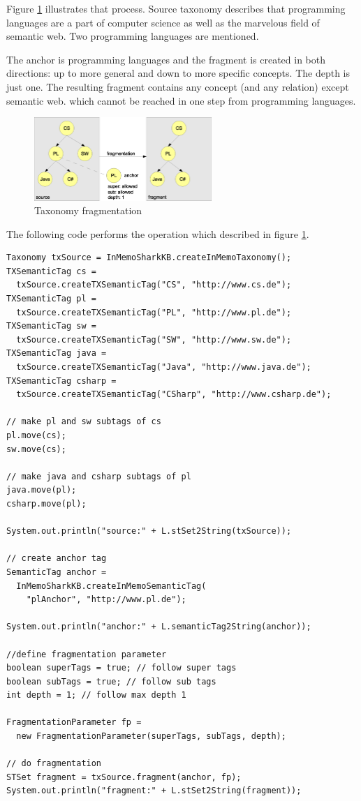 Figure \ref{fig:taxonomyFragmentation} illustrates that process. Source taxonomy describes that programming languages are a part of computer science as well as
the marvelous field of semantic web. Two programming languages are mentioned.

The anchor is programming languages and the fragment is created in both directions: up to more general and down to more specific concepts. The depth is just one. The resulting fragment contains any concept (and any relation) except semantic web. which cannot be reached in one step from programming languages.

\begin{figure}[t]
\centering
\includegraphics[width=0.60\textwidth]{taxonomyFragmentation.eps}
\caption{Taxonomy fragmentation}
\label{fig:taxonomyFragmentation}
\end{figure}

The following code performs the operation which described in figure \ref{fig:taxonomyFragmentation}.

\begin{verbatim}
Taxonomy txSource = InMemoSharkKB.createInMemoTaxonomy();
TXSemanticTag cs = 
  txSource.createTXSemanticTag("CS", "http://www.cs.de");
TXSemanticTag pl =  
  txSource.createTXSemanticTag("PL", "http://www.pl.de");
TXSemanticTag sw = 
  txSource.createTXSemanticTag("SW", "http://www.sw.de");
TXSemanticTag java = 
  txSource.createTXSemanticTag("Java", "http://www.java.de");
TXSemanticTag csharp =
  txSource.createTXSemanticTag("CSharp", "http://www.csharp.de");

// make pl and sw subtags of cs
pl.move(cs);
sw.move(cs);

// make java and csharp subtags of pl
java.move(pl);
csharp.move(pl);

System.out.println("source:" + L.stSet2String(txSource));

// create anchor tag
SemanticTag anchor = 
  InMemoSharkKB.createInMemoSemanticTag(
    "plAnchor", "http://www.pl.de");

System.out.println("anchor:" + L.semanticTag2String(anchor));

//define fragmentation parameter
boolean superTags = true; // follow super tags
boolean subTags = true; // follow sub tags
int depth = 1; // follow max depth 1

FragmentationParameter fp = 
  new FragmentationParameter(superTags, subTags, depth);

// do fragmentation
STSet fragment = txSource.fragment(anchor, fp);
System.out.println("fragment:" + L.stSet2String(fragment));
\end{verbatim}


